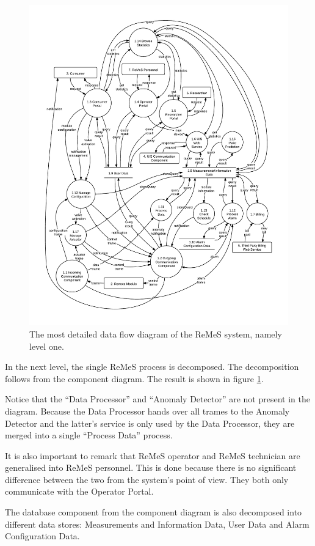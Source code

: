 \begin{figure}[h!]
	\begin{centering}
		\includegraphics[width=\textwidth]{figs/level-1.pdf}
		\caption{The most detailed data flow diagram of the ReMeS system, namely level
		one.}
		\label{fig:data-flow-diagram-lvl2}
	\end{centering}
\end{figure}

\npar In the next level, the single ReMeS process is decomposed. The
decomposition follows from the component diagram. The result is shown in figure
\ref{fig:data-flow-diagram-lvl2}.

\npar Notice that the ``Data Processor'' and ``Anomaly Detector'' are not
present in the diagram. Because the Data Processor hands over all trames 
to the Anomaly Detector and the latter's service is only used by the Data
Processor, they are merged into a single ``Process Data'' process.

\npar It is also important to remark that ReMeS operator and ReMeS technician
are generalised into ReMeS personnel. This is done because there is no
significant difference between the two from the system's point of view. They
both only communicate with the Operator Portal.

\npar The database component from the component diagram is also decomposed into
different data stores: Measurements and Information Data, User Data and Alarm
Configuration Data.


